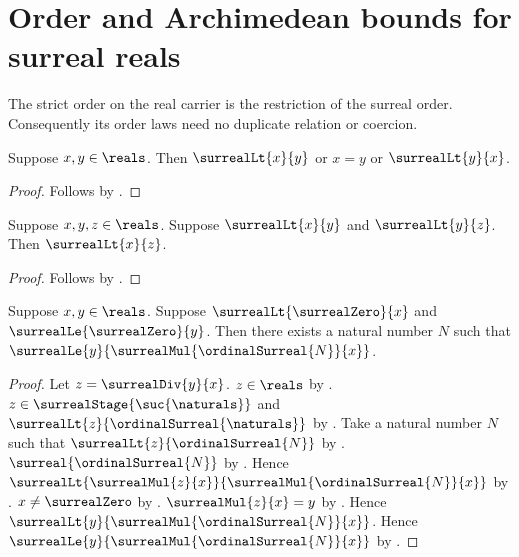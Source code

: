 

\section{Order and Archimedean bounds for surreal reals}

The strict order on the real carrier is the restriction of the surreal
order.  Consequently its order laws need no duplicate relation or coercion.

\begin{proposition}\label{surreal_real_lt_trichotomy}
    Suppose $x,y\in\reals$.
    Then $\surrealLt{x}{y}$ or $x=y$ or $\surrealLt{y}{x}$.
\end{proposition}
\begin{proof}
    Follows by
        .
\end{proof}

\begin{proposition}\label{surreal_real_lt_transitive}
    Suppose $x,y,z\in\reals$.
    Suppose $\surrealLt{x}{y}$ and $\surrealLt{y}{z}$.
    Then $\surrealLt{x}{z}$.
\end{proposition}
\begin{proof}
    Follows by
        .
\end{proof}

\begin{theorem}\label{surreal_reals_archimedean}
    Suppose $x,y\in\reals$.
    Suppose $\surrealLt{\surrealZero}{x}$ and
        $\surrealLe{\surrealZero}{y}$.
    Then there exists a natural number $N$ such that
        $\surrealLe{y}{
            \surrealMul{\ordinalSurreal{N}}{x}}$.
\end{theorem}
\begin{proof}
    Let $z=\surrealDiv{y}{x}$.
    $z\in\reals$ by .
    $z\in\surrealStage{\suc{\naturals}}$ and
        $\surrealLt{z}{\ordinalSurreal{\naturals}}$
        by .
    Take a natural number $N$ such that
        $\surrealLt{z}{\ordinalSurreal{N}}$
        by .
    $\surreal{\ordinalSurreal{N}}$
        by
        .
    Hence
        $\surrealLt{\surrealMul{z}{x}}
            {\surrealMul{\ordinalSurreal{N}}{x}}$
        by
        .
    $x\neq\surrealZero$
        by
        .
    $\surrealMul{z}{x}=y$
        by
        .
    Hence
        $\surrealLt{y}{\surrealMul{\ordinalSurreal{N}}{x}}$.
    Hence
        $\surrealLe{y}{\surrealMul{\ordinalSurreal{N}}{x}}$
        by .
\end{proof}
